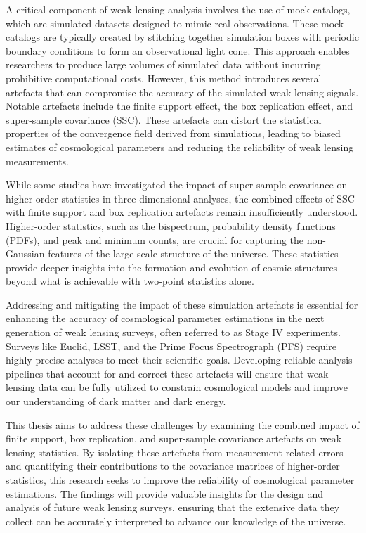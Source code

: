 A critical component of weak lensing analysis involves the use of mock catalogs, which are simulated datasets designed to mimic real observations. These mock catalogs are typically created by stitching together simulation boxes with periodic boundary conditions to form an observational light cone. This approach enables researchers to produce large volumes of simulated data without incurring prohibitive computational costs. However, this method introduces several artefacts that can compromise the accuracy of the simulated weak lensing signals. Notable artefacts include the finite support effect, the box replication effect, and super-sample covariance (SSC). These artefacts can distort the statistical properties of the convergence field derived from simulations, leading to biased estimates of cosmological parameters and reducing the reliability of weak lensing measurements.

While some studies have investigated the impact of super-sample covariance on higher-order statistics in three-dimensional analyses, the combined effects of SSC with finite support and box replication artefacts remain insufficiently understood. Higher-order statistics, such as the bispectrum, probability density functions (PDFs), and peak and minimum counts, are crucial for capturing the non-Gaussian features of the large-scale structure of the universe. These statistics provide deeper insights into the formation and evolution of cosmic structures beyond what is achievable with two-point statistics alone.

Addressing and mitigating the impact of these simulation artefacts is essential for enhancing the accuracy of cosmological parameter estimations in the next generation of weak lensing surveys, often referred to as Stage IV experiments. Surveys like Euclid, LSST, and the Prime Focus Spectrograph (PFS) require highly precise analyses to meet their scientific goals. Developing reliable analysis pipelines that account for and correct these artefacts will ensure that weak lensing data can be fully utilized to constrain cosmological models and improve our understanding of dark matter and dark energy.

This thesis aims to address these challenges by examining the combined impact of finite support, box replication, and super-sample covariance artefacts on weak lensing statistics. By isolating these artefacts from measurement-related errors and quantifying their contributions to the covariance matrices of higher-order statistics, this research seeks to improve the reliability of cosmological parameter estimations. The findings will provide valuable insights for the design and analysis of future weak lensing surveys, ensuring that the extensive data they collect can be accurately interpreted to advance our knowledge of the universe.

